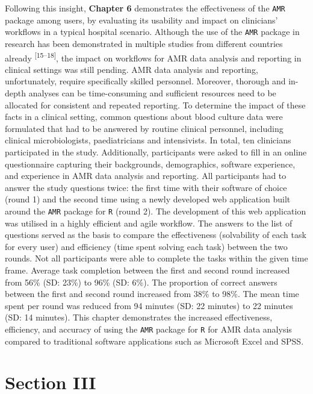 \documentclass[
]{book}
\begin{document}
Following this insight, \textbf{Chapter 6} demonstrates the effectiveness of the \texttt{AMR} package among users, by evaluating its usability and impact on clinicians' workflows in a typical hospital scenario. Although the use of the \texttt{AMR} package in research has been demonstrated in multiple studies from different countries already \textsuperscript{{[}15--18{]}}, the impact on workflows for AMR data analysis and reporting in clinical settings was still pending. AMR data analysis and reporting, unfortunately, require specifically skilled personnel. Moreover, thorough and in-depth analyses can be time-consuming and sufficient resources need to be allocated for consistent and repeated reporting. To determine the impact of these facts in a clinical setting, common questions about blood culture data were formulated that had to be answered by routine clinical personnel, including clinical microbiologists, paediatricians and intensivists. In total, ten clinicians participated in the study. Additionally, participants were asked to fill in an online questionnaire capturing their backgrounds, demographics, software experience, and experience in AMR data analysis and reporting. All participants had to answer the study questions twice: the first time with their software of choice (round 1) and the second time using a newly developed web application built around the \texttt{AMR} package for \texttt{R} (round 2). The development of this web application was utilised in a highly efficient and agile workflow. The answers to the list of questions served as the basis to compare the effectiveness (solvability of each task for every user) and efficiency (time spent solving each task) between the two rounds. Not all participants were able to complete the tasks within the given time frame. Average task completion between the first and second round increased from 56\% (SD: 23\%) to 96\% (SD: 6\%). The proportion of correct answers between the first and second round increased from 38\% to 98\%. The mean time spent per round was reduced from 94 minutes (SD: 22 minutes) to 22 minutes (SD: 14 minutes). This chapter demonstrates the increased effectiveness, efficiency, and accuracy of using the \texttt{AMR} package for \texttt{R} for AMR data analysis compared to traditional software applications such as Microsoft Excel and SPSS.

\hypertarget{section-iii}{%
\section*{Section III}\label{section-iii}}
\end{document}
